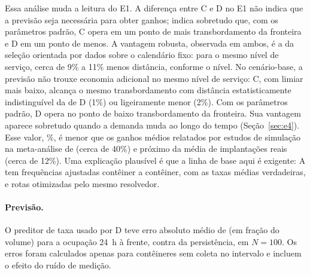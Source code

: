 \begin{table}[ht]
\centering
\caption{E2 -- distância necessária no mesmo nível de transbordamento (interpolação por semente; diferença em km/dia). Todas as políticas alcançaram os dois níveis nas 20 sementes, e todas as comparações têm 20 pares.}
\label{tab:e2}
\scriptsize
\resizebox{\textwidth}{!}{}
\end{table}

Essa análise muda a leitura do E1. A diferença entre C e D no E1 não indica
que a previsão seja necessária para obter ganhos; indica sobretudo que, com os
parâmetros padrão, C opera em um ponto de mais transbordamento da fronteira e
D em um ponto de menos. A vantagem robusta, observada em ambos, é a da seleção
orientada por dados sobre o calendário fixo: para o mesmo nível de serviço,
cerca de 9\% a 11\% menos distância, conforme o nível. No cenário-base, a
previsão não trouxe economia adicional no mesmo nível de serviço: C, com
limiar mais baixo, alcança o mesmo transbordamento com distância
estatisticamente indistinguível da de D (1\%) ou ligeiramente menor (2\%). Com os
parâmetros padrão, D opera no ponto de baixo transbordamento da fronteira.
Sua vantagem aparece sobretudo quando a demanda muda ao longo do tempo
(Seção~\ref{sec:e4}). Esse valor, \RelFrontUmDvsA\%, é menor que os
ganhos médios relatados por estudos de simulação na meta-análise de
\cite{maciel2025impact} (cerca de 40\%) e próximo da média de implantações
reais (cerca de 12\%). Uma explicação plausível é que a linha de base aqui
é exigente: A tem frequências ajustadas contêiner a contêiner, com as taxas
médias verdadeiras, e rotas otimizadas pelo mesmo resolvedor.

\paragraph{Previsão.}
O preditor de taxa usado por D teve erro absoluto médio de \PredNCemD{} (em
fração do volume) para a ocupação 24~h à frente, contra \PersistNCemD{} da
persistência, em $N = 100$. Os erros foram calculados apenas para contêineres
sem coleta no intervalo e incluem o efeito do ruído de medição.


